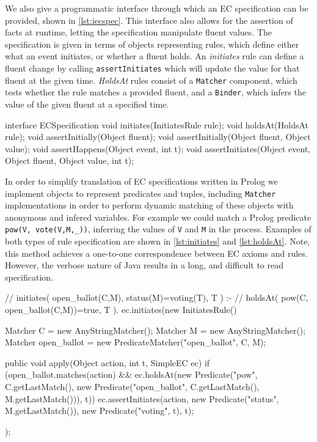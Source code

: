 We also give a programmatic interface through which an \ac{EC} specification
can be provided, shown in \autoref{lst:iecspec}. This interface also allows for
the assertion of facts at runtime, letting the specification manipulate
fluent values. The specification is given in terms of objects representing
rules, which define either what an event initiates, or whether a fluent holds.
An \emph{initiates} rule can define a fluent change by calling
\texttt{assertInitiates} which will update the value for that fluent at the
given time. \emph{HoldsAt} rules consist of a \texttt{Matcher} component, which
tests whether the rule matches a provided fluent, and a \texttt{Binder}, which
infers the value of the given fluent at a specified time.

\begin{java}[label=lst:iecspec,caption=Java interface for declaration of an EC specification]
interface ECSpecification {
	void initiates(InitiatesRule rule);
	void holdsAt(HoldsAt rule);
	void assertInitially(Object fluent);
	void assertInitially(Object fluent, Object value);
	void assertHappens(Object event, int t);
	void assertInitiates(Object event, Object fluent, Object value, int t);
}
\end{java}

In order to simplify translation of \ac{EC} specifications written in Prolog
we implement objects to represent predicates and tuples, including
\texttt{Matcher} implementations in order to perform dynamic matching of these
objects with anonymous and infered variables. For example we could match a
Prolog predicate \texttt{pow(V, vote(V,M,\_))}, inferring the values of
\texttt{V} and \texttt{M} in the process. Examples of both types of rule
specification are shown in \autoref{lst:initiates} and \autoref{lst:holdsAt}.
Note, this method achieves a one-to-one correspondence between \ac{EC} axioms
and rules. However, the verbose nature of Java results in a long, and
difficult to read specification.

\begin{java}[label=lst:initiates, caption={[Example of initiates rule]Example of initiates rule. Matchers are used to built a description of the event we wish to match. The matched arguments in this event are then used in the \emph{holdsAt} query to check whether the actor is empowered to perform the action. If the event and query are both valid we assert the change to the \emph{status} predicate.}]
// initiates( open_ballot(C,M), status(M)=voting(T), T ) :-
//     holdsAt( pow(C, open_ballot(C,M))=true, T ).
ec.initiates(new InitiatesRule() {
	Matcher C = new AnyStringMatcher();
	Matcher M = new AnyStringMatcher();
	Matcher open_ballot = new PredicateMatcher("open_ballot", C, M);

	public void apply(Object action, int t, SimpleEC ec) {
		if (open_ballot.matches(action)
				&& ec.holdsAt(new Predicate("pow", C.getLastMatch(),
						new Predicate("open_ballot", C.getLastMatch(),
								M.getLastMatch())), t)) {
			ec.assertInitiates(action,
					new Predicate("status", M.getLastMatch()),
					new Predicate("voting", t), t);
		}
	}
});
\end{java}

